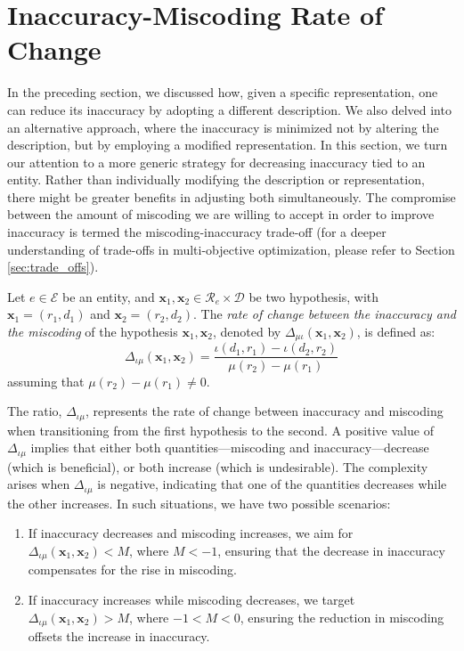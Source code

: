 %
%

\section{Inaccuracy-Miscoding Rate of Change}

In the preceding section, we discussed how, given a specific representation, one can reduce its inaccuracy by adopting a different description. We also delved into an alternative approach, where the inaccuracy is minimized not by altering the description, but by employing a modified representation. In this section, we turn our attention to a more generic strategy for decreasing inaccuracy tied to an entity. Rather than individually modifying the description or representation, there might be greater benefits in adjusting both simultaneously. The compromise between the amount of miscoding we are willing to accept in order to improve inaccuracy is termed the miscoding-inaccuracy trade-off (for a deeper understanding of trade-offs in multi-objective optimization, please refer to Section \ref{sec:trade_offs}).

\begin{definition}
Let $e \in \mathcal{E}$ be an entity, and $\mathbf{x}_1, \mathbf{x}_2 \in \mathcal{R}_e \times \mathcal{D}$ be two hypothesis, with $\mathbf{x}_1 = (r_1, d_1)$ and $\mathbf{x}_2 = (r_2, d_2)$. The \emph{rate of change between the inaccuracy and the miscoding} of the hypothesis $\mathbf{x}_1, \mathbf{x}_2$, denoted by $\Delta_{\mu \iota} ( \mathbf{x}_1, \mathbf{x}_2 )$, is defined as:
\[
\Delta_{\iota \mu} ( \mathbf{x}_1, \mathbf{x}_2 ) = \frac{\iota(d_1, r_1) - \iota(d_2, r_2)}{\mu(r_2) - \mu(r_1)}
\] 
assuming that $\mu(r_2) - \mu(r_1) \neq 0$.
\end{definition}

The ratio, \( \Delta_{\iota \mu} \), represents the rate of change between inaccuracy and miscoding when transitioning from the first hypothesis to the second. A positive value of \( \Delta_{\iota \mu} \) implies that either both quantities—miscoding and inaccuracy—decrease (which is beneficial), or both increase (which is undesirable). The complexity arises when \( \Delta_{\iota \mu} \) is negative, indicating that one of the quantities decreases while the other increases. In such situations, we have two possible scenarios:

\begin{enumerate}[label=(\roman*)]
\item If inaccuracy decreases and miscoding increases, we aim for \( \Delta_{\iota \mu} ( \mathbf{x}_1, \mathbf{x}_2 ) < M \), where \( M < -1 \), ensuring that the decrease in inaccuracy compensates for the rise in miscoding.
\item If inaccuracy increases while miscoding decreases, we target \( \Delta_{\iota \mu} ( \mathbf{x}_1, \mathbf{x}_2 ) > M \), where \( -1 < M < 0 \), ensuring the reduction in miscoding offsets the increase in inaccuracy. 
\end{enumerate}

